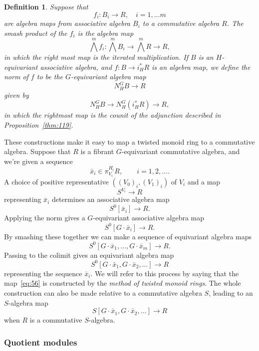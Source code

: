 \documentclass{amsart}
\newtheorem{definition}[equation]{Definition}
\newenvironment{defin}{\begin{definition}\rm}{\end{definition}}
\theoremstyle{definition}
\newtheorem{defin}[equation]{Definition}
\theoremstyle{remark}
\newcommand{\norm}{N}
\newcommand{\gbar}{\bar}
\begin{document}
\begin{defin}
\label{def:32}
Suppose that
\[
f_{i}:B_{i}\to R,\quad i=1,\dots m
\]
are algebra maps from associative algebra $B_{i}$ to a commutative
algebra $R$.  The {\em smash product} of the $f_{i}$ is the algebra
map
\[
\bigwedge^{m} f_{i} : \bigwedge^{m} B_{i} \to \bigwedge^{m}R \to R,
\]
in which the right most map is the iterated multiplication.  If $B$ is
an $H$-equivariant associative algebra, and $f:B\to i_{H}^{\ast}R$ is
an algebra map, we define the {\em norm of $f$} to be the $G$-equivariant algebra
map
\[
\norm_{H}^{G}B\to R
\]
given by
\[
\norm_{H}^{G} B\to \norm_{H}^{G}(i_{H}^{\ast}R)\to R,
\]
in which the rightmost map is the counit of the adjunction described
in Proposition~\ref{thm:119}.
\end{defin}


These constructions make it easy to map a twisted monoid ring to a
commutative algebra.  Suppose that $R$ is a fibrant $G$-equivariant
commutative algebra, and we're given a sequence
\[
\gbar{x}_{i}\in \pi^{H_{i}}_{V_{i}} R,\qquad i = 1,2,\dots.
\]
A choice of positive representative $((V_{0})_{i},(V_{1})_{i})$ of
$V_{i}$ and a map
\[
S^{V_{i}}\to R
\]
representing $\gbar{x}_{i}$ determines an associative algebra map
\[
S^{0}[\gbar{x}_{i}] \to R.
\]
Applying the norm gives a $G$-equivariant associative algebra map
\[
S^{0}[G\cdot\gbar{x}_{i}] \to R.
\]
By smashing these together we can make a sequence of equivariant
algebra maps
\[
S^{0}[G\cdot\gbar{x}_{1},\dots,G\cdot\gbar{x}_{m}] \to R.
\]
Passing to the colimit gives an equivariant algebra map
\begin{equation}\label{eq:56}
S^{0}[G\cdot\gbar{x}_{1},G\cdot\gbar{x}_{2},\dots] \to R
\end{equation}
representing the sequence $\gbar{x}_{i}$.  We will refer to this
process by saying that the map~\eqref{eq:56} is constructed by the
{\em method of twisted monoid rings}.  The whole construction can also
be made relative to a commutative algebra $S$, leading to an
$S$-algebra map
\begin{equation}\label{eq:37}
S[G\cdot\gbar{x}_{1},G\cdot\gbar{x}_{2},\dots] \to R
\end{equation}
when $R$ is a commutative $S$-algebra.

\subsubsection{Quotient modules}
\label{sec:quotient-rings}
\end{document}
